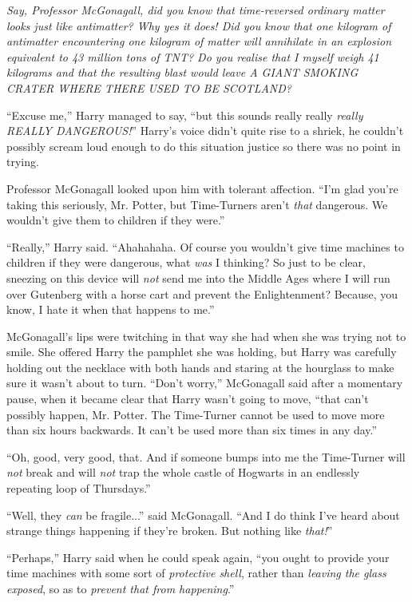 \emph{Say, Professor McGonagall, did you know that time-reversed ordinary matter looks just like antimatter? Why yes it does! Did you know that one kilogram of antimatter encountering one kilogram of matter will annihilate in an explosion equivalent to 43 million tons of TNT? Do you realise that I myself weigh 41 kilograms and that the resulting blast would leave A GIANT SMOKING CRATER WHERE THERE USED TO BE SCOTLAND?}

``Excuse me,'' Harry managed to say, ``but this sounds really really \emph{really REALLY DANGEROUS!}'' Harry's voice didn't quite rise to a shriek, he couldn't possibly scream loud enough to do this situation justice so there was no point in trying.

Professor McGonagall looked upon him with tolerant affection. ``I'm glad you're taking this seriously, Mr. Potter, but Time-Turners aren't \emph{that} dangerous. We wouldn't give them to children if they were.''

``Really,'' Harry said. ``Ahahahaha. Of course you wouldn't give time machines to children if they were dangerous, what \emph{was} I thinking? So just to be clear, sneezing on this device will \emph{not} send me into the Middle Ages where I will run over Gutenberg with a horse cart and prevent the Enlightenment? Because, you know, I hate it when that happens to me.''

McGonagall's lips were twitching in that way she had when she was trying not to smile. She offered Harry the pamphlet she was holding, but Harry was carefully holding out the necklace with both hands and staring at the hourglass to make sure it wasn't about to turn. ``Don't worry,'' McGonagall said after a momentary pause, when it became clear that Harry wasn't going to move, ``that can't possibly happen, Mr. Potter. The Time-Turner cannot be used to move more than six hours backwards. It can't be used more than six times in any day.''

``Oh, good, very good, that. And if someone bumps into me the Time-Turner will \emph{not} break and will \emph{not} trap the whole castle of Hogwarts in an endlessly repeating loop of Thursdays.''

``Well, they \emph{can} be fragile...'' said McGonagall. ``And I do think I've heard about strange things happening if they're broken. But nothing like \emph{that!}''

``Perhaps,'' Harry said when he could speak again, ``you ought to provide your time machines with some sort of \emph{protective shell}, rather than \emph{leaving the glass exposed}, so as to \emph{prevent that from happening}.''

